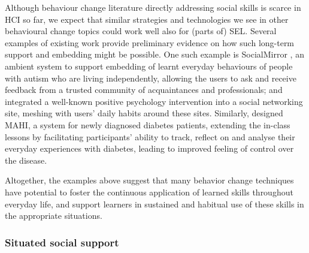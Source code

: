 \documentclass[prodmode,acmtochi]{acmsmall}
\newcommand{\GeraldineFIX}[1]{}
\newcommand{\GeraldineTODO}[1]{}
\begin{document}
Although behaviour change literature directly addressing social skills is scarce in HCI so far, we expect that  similar strategies and technologies we see in other behavioural change topics could work well also for (parts of) SEL.
Several examples of existing work provide preliminary evidence on how such long-term support and embedding might be possible. %
%
One such example is SocialMirror \cite{Hong2012}, an ambient system to support embedding of learnt everyday behaviours of people with autism who are living independently, allowing the users to ask and receive feedback\GeraldineFIX{G: not so clearly behaviour change in the way it is described? } from a trusted community of acquaintances and professionals;  and  integrated a well-known positive psychology intervention into a social networking site, meshing with users' daily habits around these sites. 
Similarly,  designed MAHI, a system for newly diagnosed diabetes patients, extending the in-class lessons by facilitating participants' ability to track, reflect on and analyse their everyday experiences with diabetes, leading to improved feeling of control over the disease.
\GeraldineTODO{G: again not so clearly behaviour change but better fitting with reflection section???}

Altogether, the examples above suggest that many behavior change techniques have potential to foster the continuous application of learned skills throughout everyday life, and support learners in sustained and habitual use of these skills in the appropriate situations. %

\subsubsection{Situated social support} 
\end{document}
